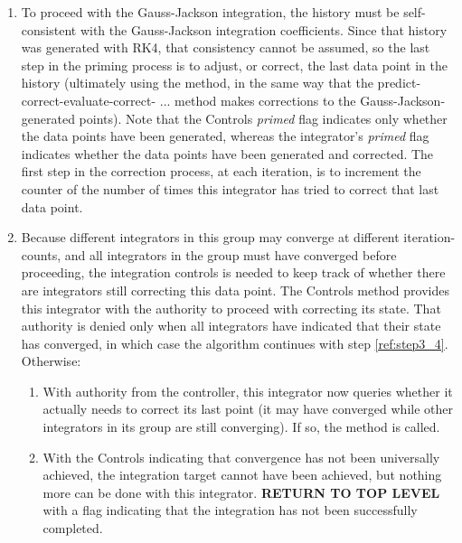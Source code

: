 \begin{enumerate}
\begin{enumerate}
\item \label{ref:step3_2}To proceed with the Gauss-Jackson integration,
the history must be
self-consistent with the Gauss-Jackson integration coefficients.
Since that history was generated with RK4, that consistency cannot be
assumed, so the last step in the priming process is to
adjust, or correct, the last data point in
the history (ultimately using the 
method, in the same way that the predict-correct-evaluate-correct- ...
method makes corrections to the Gauss-Jackson-generated points).
Note that the Controls \textit{primed} flag indicates only
whether the data points have been generated, whereas the
integrator's \textit{primed} flag indicates whether the data
points have been generated and corrected. The first step in the
correction process, at each iteration, is to increment the counter of
the number of times this integrator has tried to correct that last data
point.

\item Because different integrators in this group may converge at
different iteration-counts, and all integrators in the group must have
converged before proceeding, the integration controls is needed to keep
track of whether there are integrators still correcting this data
point. The Controls method
provides this integrator with the
authority to proceed with correcting its state.  That authority is denied only 
when all integrators have indicated that their state has converged, in which 
case the algorithm
continues with step \ref{ref:step3_4}.  Otherwise:

\begin{enumerate}
\item With authority from the controller, this integrator now queries
whether it actually needs to correct its last point (it may have
converged while other integrators in its group are still converging).
If so, the method 
is called.

\item With the Controls indicating that convergence has not been
universally achieved, the integration target cannot have been achieved,
but nothing more can be done with this integrator. \textbf{RETURN TO
TOP LEVEL} with a flag indicating that the integration has not been
successfully completed.

\end{enumerate}


\end{enumerate}
\end{enumerate}
